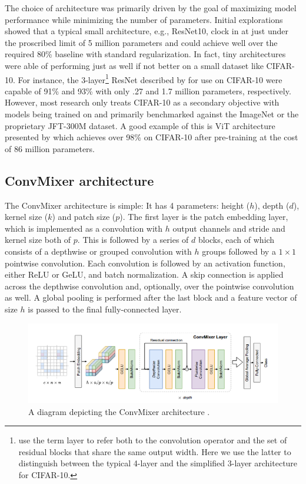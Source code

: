 \documentclass[letterpaper]{article} %
\begin{document}
The choice of architecture was primarily driven by the goal of maximizing model performance while minimizing the number of parameters. Initial explorations showed that a typical small architecture, e.g., ResNet10, clock in at just under the proscribed limit of 5 million parameters and could achieve well over the required 80\% baseline with standard regularization. In fact, tiny architectures were able of performing just as well if not better on a small dataset like CIFAR-10. For instance, the 3-layer\footnote{\citet{He2015} use the term layer to refer both to the convolution operator and the set of residual blocks that share the same output width. Here we use the latter to distinguish between the typical 4-layer and the simplified 3-layer architecture for CIFAR-10.} ResNet described by \citet{He2015} for use on CIFAR-10 were capable of 91\% and 93\% with only .27 and 1.7 million parameters, respectively. However, most research only treats CIFAR-10 as a secondary objective with models being trained on and primarily benchmarked against the ImageNet or the proprietary JFT-300M dataset. A good example of this is ViT architecture presented by \citet{Dosovitskiy2020} which achieves over 98\% on CIFAR-10 after pre-training at the cost of 86 million parameters.

\subsection{ConvMixer architecture}

The ConvMixer architecture is simple: It has 4 parameters: height ($h$), depth ($d$), kernel size ($k$) and patch size ($p$). The first layer is the patch embedding layer, which is implemented as a convolution with $h$ output channels and stride and kernel size both of $p$. This is followed by a series of $d$ blocks, each of which consists of a depthwise or grouped convolution with $h$ groups followed by a $1 \times 1$ pointwise convolution. Each convolution is followed by an activation function, either ReLU or GeLU, and batch normalization. A skip connection is applied across the depthwise convolution and, optionally, over the pointwise convolution as well. A global pooling is performed after the last block and a feature vector of size $h$ is passed to the final fully-connected layer.

\begin{figure}
    \includegraphics[width=\linewidth]{convmixer_diagram.png}
    \caption{A diagram depicting the ConvMixer architecture \citep{trockman2022patches}.}
\end{figure}
\end{document}
